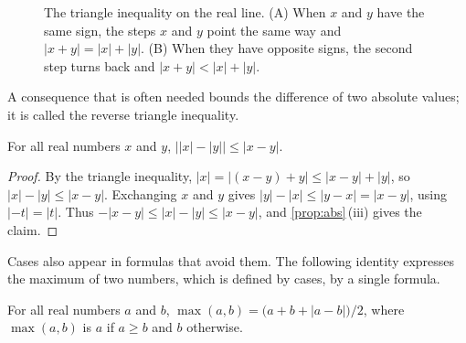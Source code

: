 \begin{figure}
\hfill
{}
\caption{The triangle inequality on the real line. (A) When $x$ and $y$ have the same sign, the steps $x$ and $y$ point the same way and $|x+y|=|x|+|y|$. (B) When they have opposite signs, the second step turns back and $|x+y|<|x|+|y|$.}
\label{fig:triangle}
\end{figure}

A consequence that is often needed bounds the difference of two absolute values; it is called the reverse triangle inequality.

\begin{corollary}
\label{cor:reverse-triangle}
For all real numbers $x$ and $y$, $\bigl||x|-|y|\bigr|\le|x-y|$.
\end{corollary}

\begin{proof}
By the triangle inequality, $|x|=|(x-y)+y|\le|x-y|+|y|$, so $|x|-|y|\le|x-y|$. Exchanging $x$ and $y$ gives $|y|-|x|\le|y-x|=|x-y|$, using $|-t|=|t|$. Thus $-|x-y|\le|x|-|y|\le|x-y|$, and \cref{prop:abs}\,(iii) gives the claim.
\end{proof}

Cases also appear in formulas that avoid them. The following identity expresses the maximum of two numbers, which is defined by cases, by a single formula.

\begin{proposition}
\label{prop:max}
For all real numbers $a$ and $b$, $\max(a,b)=\bigl(a+b+|a-b|\bigr)/2$, where $\max(a,b)$ is $a$ if $a\ge b$ and $b$ otherwise.
\end{proposition}

